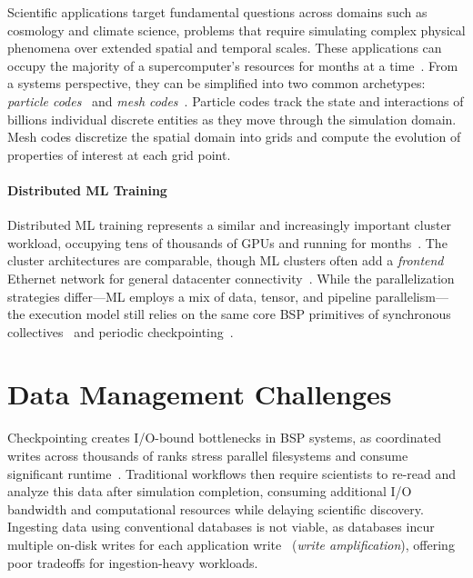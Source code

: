 Scientific applications target fundamental questions across domains such as cosmology and climate
science, problems that require simulating complex physical phenomena over extended spatial and
temporal scales.
These applications can occupy the majority of a supercomputer's resources for months at a
time~\cite{Das2023:LargeScale, Stock2024:LargeScale,Gary2023:LANLPlatformPlanning}.
From a systems perspective, they can be simplified into two common archetypes: \emph{particle
  codes}~\cite{Bird2022:VPIC2.0} and \emph{mesh codes}~\cite{Dubey2014:Survey}.
Particle codes track the state and interactions of billions individual discrete entities as they
move through the simulation domain.
Mesh codes discretize the spatial domain into grids and compute the evolution of properties of
interest at each grid point.


\paragraph{Distributed ML Training}
Distributed ML training represents a similar and increasingly important cluster workload, occupying
tens of thousands of GPUs and running for
months~\cite{:LlamaScale,Rahma2024:MLScale,Gratt2024:Llama3Scale}.
The cluster architectures are comparable, though ML clusters often add a \emph{frontend} Ethernet
network for general datacenter connectivity~\cite{Gangi2024:RDMA}.
While the parallelization strategies differ---ML employs a mix of data, tensor, and pipeline
parallelism---the execution model still relies on the same core BSP primitives of synchronous
collectives~\cite{Gangi2024:RDMA} and periodic checkpointing~\cite{Eisen2022:Checkpoint}.

\section{Data Management Challenges}
\label{sec:bg:data}

Checkpointing creates I/O-bound bottlenecks in BSP systems, as coordinated writes across thousands
of ranks stress parallel filesystems and consume significant
runtime~\cite{Xie2012:CharacterizingOutputBottlenecks}.
Traditional workflows then require scientists to re-read and analyze this data after simulation
completion, consuming additional I/O bandwidth and computational resources while delaying
scientific discovery.
Ingesting data using conventional databases is not viable, as databases incur multiple on-disk
writes for each application write~\cite{Raju2017:PebblesDB} (\emph{write amplification}), offering
poor tradeoffs for ingestion-heavy workloads.

